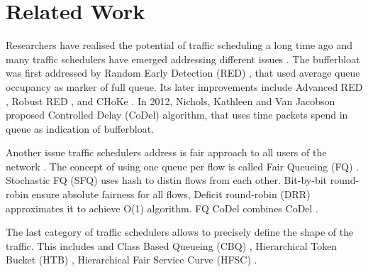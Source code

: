 \section*{Related Work}
Researchers have realised the potential  of traffic scheduling a long time ago and many traffic schedulers have emerged addressing different issues . The bufferbloat was first addressed by Random Early Detection (RED) \cite{Floyd:1993:RED:169931.169935}, that used average queue occupancy as marker of full queue. Its later improvements include Advanced RED \cite{Floyd01adaptivered:}, Robust RED \cite{RRED}, and CHoKe \cite{pan2000choke}. In 2012, Nichols, Kathleen and Van Jacobson proposed Controlled Delay (CoDel) algorithm, that uses time packets spend in queue as indication of bufferbloat.

Another issue  traffic schedulers address is fair approach to all users of the network . The concept of using one  queue per  flow  is called Fair Queueing (FQ)  \cite{Nagle:FQ} . Stochastic FQ (SFQ) \cite{SFQ} uses  hash  to distin  flows from each other. Bit-by-bit round-robin \cite{demers1989analysis} ensure  absolute fairness for all flows, Deficit round-robin (DRR) \cite{EffDRR} approximates it to achieve O(1) algorithm. FQ CoDel \cite{fq_codel} combines CoDel  .

The last  category of traffic schedulers allows   to precisely  define the shape of the traffic.  This includes and Class Based Queueing (CBQ) \cite{CBQ}, Hierarchical Token Bucket (HTB) \cite{HTB},  Hierarchical Fair Service Curve (HFSC) \cite{HFSC}.

